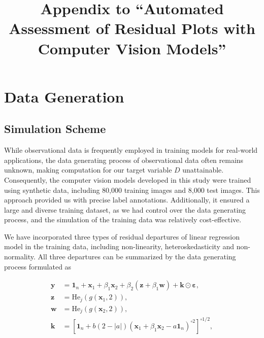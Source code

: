 \documentclass[]{interact}
\theoremstyle{plain}%
\theoremstyle{definition}
\theoremstyle{remark}
\begin{document}
\articletype{}

\title{Appendix to ``Automated Assessment of Residual Plots with
Computer Vision Models''}


\author{
}


\maketitle



\appendix

\section{Data Generation}\label{sec-model-data-generation}

\subsection{Simulation Scheme}\label{simulation-scheme}

While observational data is frequently employed in training models for
real-world applications, the data generating process of observational
data often remains unknown, making computation for our target variable
\(D\) unattainable. Consequently, the computer vision models developed
in this study were trained using synthetic data, including 80,000
training images and 8,000 test images. This approach provided us with
precise label annotations. Additionally, it ensured a large and diverse
training dataset, as we had control over the data generating process,
and the simulation of the training data was relatively cost-effective.

We have incorporated three types of residual departures of linear
regression model in the training data, including non-linearity,
heteroskedasticity and non-normality. All three departures can be
summarized by the data generating process formulated as

\begin{align} \label{eq:data-sim}
\boldsymbol{y} &= \boldsymbol{1}_n + \boldsymbol{x}_1 + \beta_1\boldsymbol{x}_2 + \beta_2(\boldsymbol{z} + \beta_1\boldsymbol{w}) + \boldsymbol{k} \odot \boldsymbol{\varepsilon}, \\
\boldsymbol{z} &= \text{He}_j(g(\boldsymbol{x}_1, 2)), \\
\boldsymbol{w} &= \text{He}_j(g(\boldsymbol{x}_2, 2)), \\
\boldsymbol{k} &= \left[\boldsymbol{1}_n + b(2 - |a|)(\boldsymbol{x}_1 + \beta_1\boldsymbol{x}_2 - a\boldsymbol{1}_n)^{\circ2}\right]^{\circ1/2},
\end{align}
\end{document}

